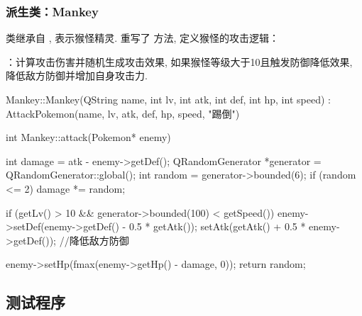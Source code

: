 \subsubsection{派生类：Mankey}

 类继承自 , 表示猴怪精灵. 重写了  方法, 定义猴怪的攻击逻辑：

：计算攻击伤害并随机生成攻击效果, 如果猴怪等级大于10且触发防御降低效果, 降低敌方防御并增加自身攻击力.

\begin{cppcode}
    Mankey::Mankey(QString name, int lv, int atk, int def, int hp, int speed) : AttackPokemon(name, lv, atk, def, hp, speed, "踢倒") {}

    int Mankey::attack(Pokemon* enemy) {
            int damage = atk - enemy->getDef();
            QRandomGenerator *generator = QRandomGenerator::global();
            int random = generator->bounded(6);
            if (random <= 2) {
                    damage *= random;
                }

            if (getLv() > 10 && generator->bounded(100) < getSpeed()) {
                    enemy->setDef(enemy->getDef() - 0.5 * getAtk());
                    setAtk(getAtk() + 0.5 * enemy->getDef());
                }//降低敌方防御

            enemy->setHp(fmax(enemy->getHp() - damage, 0));
            return random;
        }
\end{cppcode}

\subsection{测试程序}

